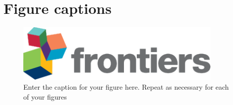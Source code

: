 \documentclass[utf8]{frontiersSCNS}
\begin{document}



\section*{Figure captions}


\begin{figure}[h!]
\begin{center}
\includegraphics[width=10cm]{logo1}%
\end{center}
\caption{ Enter the caption for your figure here.  Repeat as  necessary for each of your figures}\label{fig:1}
\end{figure}
\end{document}
